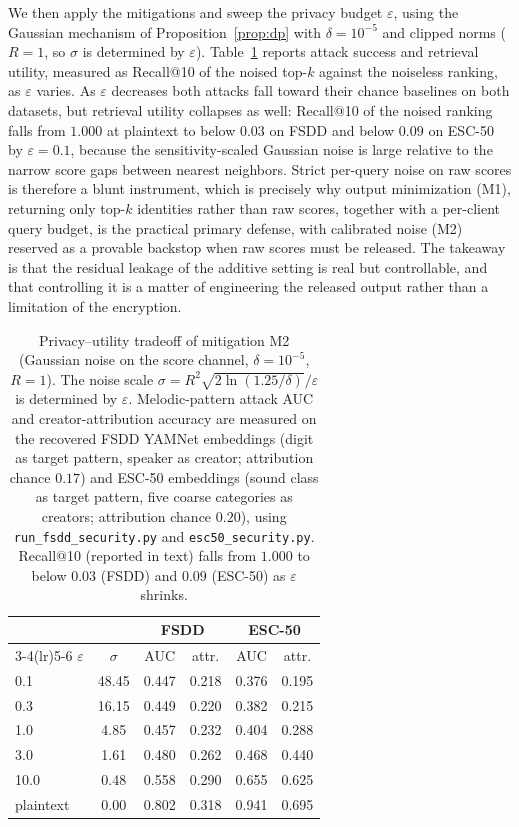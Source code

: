 \documentclass[sigconf,nonacm]{acmart}
\begin{document}
We then apply the mitigations and sweep the privacy budget $\varepsilon$, using the Gaussian mechanism of Proposition~\ref{prop:dp} with $\delta{=}10^{-5}$ and clipped norms ($R{=}1$, so $\sigma$ is determined by $\varepsilon$). Table~\ref{tab:security} reports attack success and retrieval utility, measured as Recall@10 of the noised top-$k$ against the noiseless ranking, as $\varepsilon$ varies. As $\varepsilon$ decreases both attacks fall toward their chance baselines on both datasets, but retrieval utility collapses as well: Recall@10 of the noised ranking falls from $1.000$ at plaintext to below $0.03$ on FSDD and below $0.09$ on ESC-50 by $\varepsilon{=}0.1$, because the sensitivity-scaled Gaussian noise is large relative to the narrow score gaps between nearest neighbors. Strict per-query noise on raw scores is therefore a blunt instrument, which is precisely why output minimization (M1), returning only top-$k$ identities rather than raw scores, together with a per-client query budget, is the practical primary defense, with calibrated noise (M2) reserved as a provable backstop when raw scores must be released. The takeaway is that the residual leakage of the additive setting is real but controllable, and that controlling it is a matter of engineering the released output rather than a limitation of the encryption.

\begin{table}[t]
\centering\setlength{\tabcolsep}{4.5pt}
\begin{tabular}{lc cc cc}
\toprule
 & & \multicolumn{2}{c}{\textbf{FSDD}} & \multicolumn{2}{c}{\textbf{ESC-50}} \\
\cmidrule(lr){3-4}\cmidrule(lr){5-6}
$\varepsilon$ & $\sigma$ & AUC & attr. & AUC & attr. \\
\midrule
0.1       & 48.45 & 0.447 & 0.218 & 0.376 & 0.195 \\
0.3       & 16.15 & 0.449 & 0.220 & 0.382 & 0.215 \\
1.0       & 4.85  & 0.457 & 0.232 & 0.404 & 0.288 \\
3.0       & 1.61  & 0.480 & 0.262 & 0.468 & 0.440 \\
10.0      & 0.48  & 0.558 & 0.290 & 0.655 & 0.625 \\
plaintext & 0.00  & 0.802 & 0.318 & 0.941 & 0.695 \\
\bottomrule
\end{tabular}
\caption{Privacy--utility tradeoff of mitigation M2 (Gaussian noise on the score channel, $\delta{=}10^{-5}$, $R{=}1$). The noise scale $\sigma=R^2\sqrt{2\ln(1.25/\delta)}/\varepsilon$ is determined by $\varepsilon$. Melodic-pattern attack AUC and creator-attribution accuracy are measured on the recovered FSDD YAMNet embeddings (digit as target pattern, speaker as creator; attribution chance $0.17$) and ESC-50 embeddings (sound class as target pattern, five coarse categories as creators; attribution chance $0.20$), using \texttt{run\_fsdd\_security.py} and \texttt{esc50\_security.py}. Recall@10 (reported in text) falls from $1.000$ to below $0.03$ (FSDD) and $0.09$ (ESC-50) as $\varepsilon$ shrinks.}
\label{tab:security}
\end{table}
\end{document}

